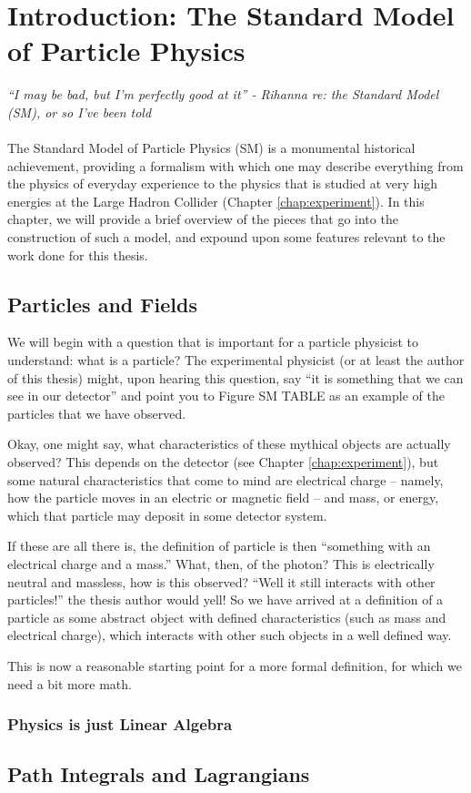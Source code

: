 \chapter{Introduction: The Standard Model of Particle Physics}
\label{chap:intro-SM}
\emph{``I may be bad, but I'm perfectly good at it'' - Rihanna re: the Standard Model (SM), or so I've been told}\\\\

The Standard Model of Particle Physics (SM) is a monumental historical achievement, providing a 
formalism with which one may describe everything from the physics of everyday experience to the 
physics that is studied at very high energies at the Large Hadron Collider (Chapter \ref{chap:experiment}). 
In this chapter, we will provide a brief overview of the pieces that go into the 
construction of such a model, and expound upon some features relevant to the work done for this thesis.

\section{Particles and Fields}
We will begin with a question that is important for a particle physicist to understand: what is a particle? 
The experimental physicist (or at least the author of this thesis) might, upon hearing this question, 
say ``it is something that we can see in our detector'' and point you to Figure SM TABLE as an example 
of the particles that we have observed.

Okay, one might say, what characteristics of these mythical objects are actually observed? This depends on the 
detector (see Chapter \ref{chap:experiment}), but some natural characteristics that come to mind are electrical 
charge -- namely, how the particle moves in an electric or magnetic field -- and mass, or energy, which that particle 
may deposit in some detector system. 

If these are all there is, the definition of particle is then ``something with an electrical charge and a mass.'' 
What, then, of the photon? This is electrically neutral and massless, how is this observed? 
``Well it still interacts with other particles!'' the thesis author would yell! So we have arrived at a definition of a
particle as some abstract object with defined characteristics (such as mass and electrical charge), which interacts 
with other such objects in a well defined way.

This is now a reasonable starting point for a more formal definition, for which we need a bit more math. 

\subsection{Physics is just Linear Algebra}


\section{Path Integrals and Lagrangians}
\section{}




